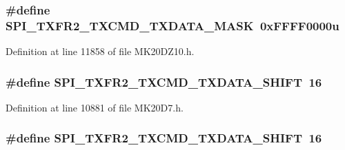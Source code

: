 \subsubsection[{\texorpdfstring{S\+P\+I\+\_\+\+T\+X\+F\+R2\+\_\+\+T\+X\+C\+M\+D\+\_\+\+T\+X\+D\+A\+T\+A\+\_\+\+M\+A\+SK}{SPI_TXFR2_TXCMD_TXDATA_MASK}}]{\setlength{\rightskip}{0pt plus 5cm}\#define S\+P\+I\+\_\+\+T\+X\+F\+R2\+\_\+\+T\+X\+C\+M\+D\+\_\+\+T\+X\+D\+A\+T\+A\+\_\+\+M\+A\+SK~0x\+F\+F\+F\+F0000u}\hypertarget{group___s_p_i___register___masks_ga7b74d7b06c2d79ce4f3f5171e63a66f6}{}\label{group___s_p_i___register___masks_ga7b74d7b06c2d79ce4f3f5171e63a66f6}


Definition at line 11858 of file M\+K20\+D\+Z10.\+h.

\subsubsection[{\texorpdfstring{S\+P\+I\+\_\+\+T\+X\+F\+R2\+\_\+\+T\+X\+C\+M\+D\+\_\+\+T\+X\+D\+A\+T\+A\+\_\+\+S\+H\+I\+FT}{SPI_TXFR2_TXCMD_TXDATA_SHIFT}}]{\setlength{\rightskip}{0pt plus 5cm}\#define S\+P\+I\+\_\+\+T\+X\+F\+R2\+\_\+\+T\+X\+C\+M\+D\+\_\+\+T\+X\+D\+A\+T\+A\+\_\+\+S\+H\+I\+FT~16}\hypertarget{group___s_p_i___register___masks_ga8093c55dfe44be309ef0286209361f0e}{}\label{group___s_p_i___register___masks_ga8093c55dfe44be309ef0286209361f0e}


Definition at line 10881 of file M\+K20\+D7.\+h.

\subsubsection[{\texorpdfstring{S\+P\+I\+\_\+\+T\+X\+F\+R2\+\_\+\+T\+X\+C\+M\+D\+\_\+\+T\+X\+D\+A\+T\+A\+\_\+\+S\+H\+I\+FT}{SPI_TXFR2_TXCMD_TXDATA_SHIFT}}]{\setlength{\rightskip}{0pt plus 5cm}\#define S\+P\+I\+\_\+\+T\+X\+F\+R2\+\_\+\+T\+X\+C\+M\+D\+\_\+\+T\+X\+D\+A\+T\+A\+\_\+\+S\+H\+I\+FT~16}\hypertarget{group___s_p_i___register___masks_ga8093c55dfe44be309ef0286209361f0e}{}\label{group___s_p_i___register___masks_ga8093c55dfe44be309ef0286209361f0e}


